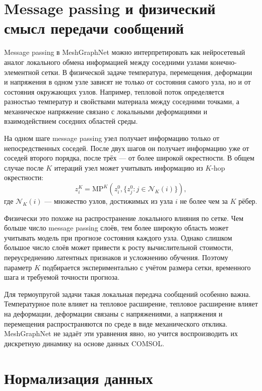 \section{Message passing и физический смысл передачи сообщений}

Message passing в MeshGraphNet можно интерпретировать как нейросетевый аналог локального обмена информацией между соседними узлами конечно-элементной сетки. В физической задаче температура, перемещения, деформации и напряжения в одном узле зависят не только от состояния самого узла, но и от состояния окружающих узлов. Например, тепловой поток определяется разностью температур и свойствами материала между соседними точками, а механическое напряжение связано с локальными деформациями и взаимодействием соседних областей среды.

На одном шаге message passing узел получает информацию только от непосредственных соседей. После двух шагов он получает информацию уже от соседей второго порядка, после трёх --- от более широкой окрестности. В общем случае после $K$ итераций узел может учитывать информацию из $K$-hop окрестности:
\begin{equation}
    z_i^K = \mathrm{MP}^{K}\left(z_i^0,\{z_j^0: j\in\mathcal{N}_K(i)\}\right),
\end{equation}
где $\mathcal{N}_K(i)$ --- множество узлов, достижимых из узла $i$ не более чем за $K$ рёбер.

Физически это похоже на распространение локального влияния по сетке. Чем больше число message passing слоёв, тем более широкую область может учитывать модель при прогнозе состояния каждого узла. Однако слишком большое число слоёв может привести к росту вычислительной стоимости, переусреднению латентных признаков и усложнению обучения. Поэтому параметр $K$ подбирается экспериментально с учётом размера сетки, временного шага и требуемой точности прогноза.

Для термоупругой задачи такая локальная передача сообщений особенно важна. Температурное поле влияет на тепловое расширение, тепловое расширение влияет на деформации, деформации связаны с напряжениями, а напряжения и перемещения распространяются по среде в виде механического отклика. MeshGraphNet не задаёт эти уравнения явно, но учится воспроизводить их дискретную динамику на основе данных COMSOL.

\section{Нормализация данных}

